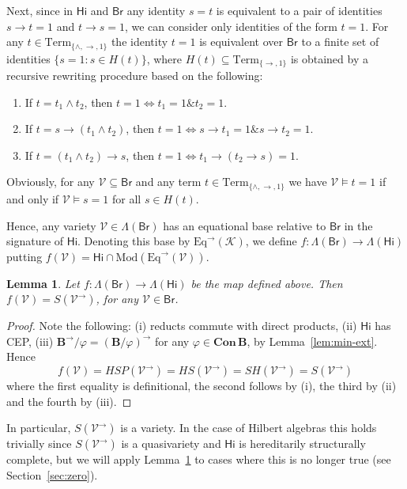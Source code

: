 \documentclass{amsart}
\newtheorem{lemma}[theorem]{Lemma}
\newcommand{\alg}[1]{\mathbf{#1}}
\newcommand{\var}[1]{\mathsf{#1}}
\newcommand{\Con}[1]{\mathbf{Con}\, #1}
\def\ra{\rightarrow}
\begin{document}
Next, since in $\var{Hi}$ and $\var{Br}$ any identity $s=t$ is
equivalent to a pair of 
identities $s\ra t = 1$ and $t\ra s=1$, we can consider only identities of the form
$t=1$. For any $t\in\mathrm{Term}_{\{\wedge,\ra,1\}}$ the identity $t = 1$ is 
equivalent over $\var{Br}$ to a finite set of identities
$\{s = 1: s\in H(t)\}$, where $H(t)\subseteq \mathrm{Term}_{\{\ra,1\}}$ is obtained
by a recursive rewriting procedure based on the following:
\begin{enumerate}
\item If $t = t_1\wedge t_2$, then $t=1\iff t_1=1 \mathbin{\&} t_2 = 1$. 
\item If $t = s\ra (t_1\wedge t_2)$, then
$t=1\iff s\ra t_1=1 \mathbin{\&} s\ra t_2 = 1$.  
\item If $t = (t_1\wedge t_2)\ra s$, then
$t=1\iff t_1\ra(t_2\ra s)=1$. 
\end{enumerate}
Obviously, for any $\mathcal{V}\subseteq\var{Br}$ and any term
$t\in \mathrm{Term}_{\{\wedge,\ra,1\}}$ we have
$\mathcal{V}\models t=1$ if and only if $\mathcal{V}\models s=1$ for all $s\in H(t)$.

Hence, any variety $\mathcal{V}\in\Lambda(\var{Br})$ has an equational base relative to
$\var{Br}$ in the signature of $\var{Hi}$. Denoting this base by
$\mathrm{Eq}^\ra(\mathcal{K})$, we define
$f\colon \Lambda(\var{Br})\to \Lambda(\var{Hi})$
putting $f(\mathcal{V}) = \var{Hi}\cap
\mathrm{Mod}(\mathrm{Eq}^\ra(\mathcal{V}))$.

\begin{lemma}\label{lem:f-charact}
Let $f\colon \Lambda(\var{Br})\to \Lambda(\var{Hi})$ be the map defined above.
Then $f(\mathcal{V}) = S(\mathcal{V}^\ra)$, for any $\mathcal{V}\in\var{Br}$.   
\end{lemma}

\begin{proof}
Note the following: (i) reducts commute with direct products, (ii)
$\var{Hi}$ has CEP, (iii) $\alg{B}^\ra/\varphi = (\alg{B}/\varphi)^\ra$ for any
$\varphi\in\Con{\alg{B}}$, by Lemma~\ref{lem:min-ext}. Hence
$$
f(\mathcal{V}) = HSP(\mathcal{V}^\ra) = HS(\mathcal{V}^\ra) = SH(\mathcal{V}^\ra)
= S(\mathcal{V}^\ra)
$$
where the first equality is definitional, the second follows by (i), the third
by (ii) and the fourth by (iii).
\end{proof}  

In particular, $S(\mathcal{V}^\ra)$ is a variety. In the case of Hilbert
algebras this holds trivially since $S(\mathcal{V}^\ra)$ is a quasivariety and
$\var{Hi}$ is hereditarily structurally complete, but we will apply
Lemma~\ref{lem:f-charact} to cases where this is no longer true
(see Section~\ref{sec:zero}).
\end{document}
